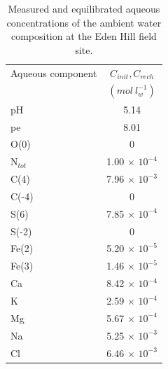 \begin{table}
\caption{Measured and equilibrated aqueous concentrations of 
the ambient water composition at the Eden Hill field site.}
\begin{center}
\begin{tabular}{l c }
\toprule
Aqueous component & $C_{init},C_{rech}$      \\
                  & $(mol\ l^{-1}_w)$        \\ 
\midrule
pH              &  5.14               \\
pe              &  8.01               \\
O(0)            &             0              \\
N$_{tot}$       &  1.00 $\times$ $10^{-4}$   \\ 
C(4)            &  7.96 $\times$ $10^{-3}$   \\
C(-4)            &            0              \\
S(6)            &  7.85 $\times$ $10^{-4}$   \\
S(-2)           &             0              \\
Fe(2)           &  5.20 $\times$ $10^{-5}$   \\
Fe(3)           &  1.46 $\times$ $10^{-5}$   \\
Ca              &  8.42 $\times$ $10^{-4}$   \\
K               &  2.59 $\times$ $10^{-4}$   \\
Mg              &  5.67 $\times$ $10^{-4}$   \\
Na              &  5.25 $\times$ $10^{-3}$   \\
Cl              &  6.46 $\times$ $10^{-3}$   \\
\bottomrule

\end{tabular}
\label{eh_caqu}
\end{center}
\end{table}

